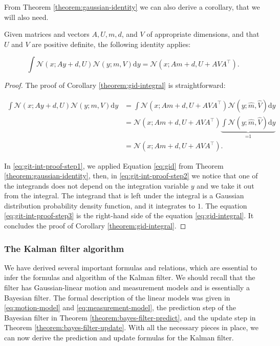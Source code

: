 From Theorem \ref{theorem:gaussian-identity} we can also derive a corollary, that we will also need.

\begin{corollary}\label{theorem:gid-integral}
    Given matrices and vectors $A, U, m, d$, and $V$ of appropriate dimensions, and that $U$ and $V$ are positive definite, the following identity applies:

    \begin{equation}\label{eq:gid-integral}
        \int \mathscr{N}(x ; A y + d, U) \mathscr{N}(y ; m, V) \mathrm{d}y=\mathscr{N}(x ; A m + d, U + A V A^\intercal).
    \end{equation}
\end{corollary}

\begin{proof}
    The proof of Corollary \ref{theorem:gid-integral} is straightforward:

    \begin{align}
        \int \mathscr{N}(x ; A y + d, U) \mathscr{N}(y ; m, V) \mathrm{d}y 
        &= \int \mathscr{N}(x ; A m + d, U + A V A^\intercal) \mathscr{N}(y ; \hat{m}, \hat{V}) \mathrm{d}y \label{eq:git-int-proof-step1} \\
        &= \mathscr{N}(x ; A m + d, U + A V A^\intercal) \underbrace{\int \mathscr{N}(y ; \hat{m}, \hat{V}) \mathrm{d}y}_{\text{=1}} \label{eq:git-int-proof-step2}\\
        &= \mathscr{N}(x ; A m + d, U + A V A^\intercal). \label{eq:git-int-proof-step3}
    \end{align}

    In \ref{eq:git-int-proof-step1}, we applied Equation \ref{eq:gid} from Theorem \ref{theorem:gaussian-identity}, then, in \ref{eq:git-int-proof-step2} we notice that one of the integrands does not depend on the integration variable $y$ and we take it out from the integral. The integrand that is left under the integral is a Gaussian distribution probability density function, and it integrates to $1$. The equation \ref{eq:git-int-proof-step3} is the right-hand side of the equation \ref{eq:gid-integral}. It concludes the proof of Corollary \ref{theorem:gid-integral}.
\end{proof}

\subsubsection{The Kalman filter algorithm}

We have derived several important formulas and relations, which are essential to infer the formulas and algorithm of the Kalman filter. We should recall that the filter has Gaussian-linear motion and measurement models and is essentially a Bayesian filter. The formal description of the linear models was given in \ref{eq:motion-model} and \ref{eq:measurement-model}, the prediction step of the Bayesian filter in Theorem \ref{theorem:bayes-filter-predict}, and the update step in Theorem \ref{theorem:bayes-filter-update}. With all the necessary pieces in place, we can now derive the prediction and update formulas for the Kalman filter.

